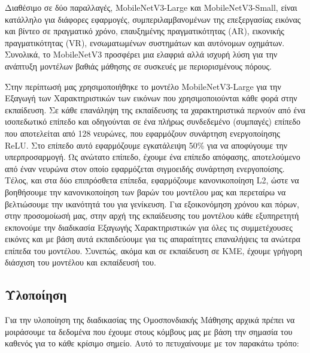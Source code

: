 Διαθέσιμο σε δύο παραλλαγές, MobileNetV3-Large και MobileNetV3-Small, είναι κατάλληλο για διάφορες εφαρμογές, συμπεριλαμβανομένων της επεξεργασίας εικόνας και βίντεο σε πραγματικό χρόνο, επαυξημένης πραγματικότητας (AR), εικονικής πραγματικότητας (VR), ενσωματωμένων συστημάτων και αυτόνομων οχημάτων. Συνολικά, το MobileNetV3 προσφέρει μια ελαφριά αλλά ισχυρή λύση για την ανάπτυξη μοντέλων βαθιάς μάθησης σε συσκευές με περιορισμένους πόρους.

Στην περίπτωσή μας χρησιμοποιήθηκε το μοντέλο MobileNetV3-Large για την Εξαγωγή των Χαρακτηριστικών των εικόνων που χρησιμοποιούνται κάθε φορά στην εκπαίδευση. Σε κάθε επανάληψη της εκπαίδευσης τα χαρακτηριστικά περνούν από ένα ισοπεδωτικό επίπεδο και οδηγούνται σε ένα πλήρως συνδεδεμένο (συμπαγές) επίπεδο που αποτελείται από 128 νευρώνες, που εφαρμόζουν συνάρτηση ενεργοποίησης ReLU. Στο επίπεδο αυτό εφαρμόζουμε εγκατάλειψη 50\% για να αποφύγουμε την υπερπροσαρμογή. Ως ανώτατο επίπεδο, έχουμε ένα επίπεδο απόφασης, αποτελούμενο από έναν νευρώνα στον οποίο εφαρμόζεται σιγμοειδής συνάρτηση ενεργοποίσης. Τέλος, και στα δύο επιπρόσθετα επίπεδα, εφαρμόζουμε κανονικοποίηση L2, ώστε να βοηθήσουμε την κανονικοποίηση των βαρών του μοντέλου μας και περεταίρω να βελτιώσουμε την ικανότητά του για γενίκευση. Για εξοικονόμηση χρόνου και πόρων, στην προσομοίωσή μας, στην αρχή της εκπαίδευσης του μοντέλου κάθε εξυπηρετητή εκπονούμε την διαδικασία Εξαγωγής Χαρακτηριστικών για όλες τις συμμετέχουσες εικόνες και με βάση αυτά εκπαιδεύουμε για τις απαραίτητες επαναλήψεις τα ανώτερα επίπεδα του μοντέλου. Συνεπώς, ακόμα και σε εκπαίδευση σε ΚΜΕ, έχουμε γρήγορη διάσχιση του μοντέλου και εκπαίδευσή του.

\vspace{-3pt}

\subsection{Υλοποίηση}

\vspace{-3pt}

Για την υλοποίηση της διαδικασίας της Ομοσπονδιακής Μάθησης αρχικά πρέπει να μοιράσουμε τα δεδομένα που έχουμε στους κόμβους μας με βάση την σημασία του καθενός για το κάθε κρίσιμο σημείο. Αυτό το πετυχαίνουμε με τον παρακάτω τρόπο:

